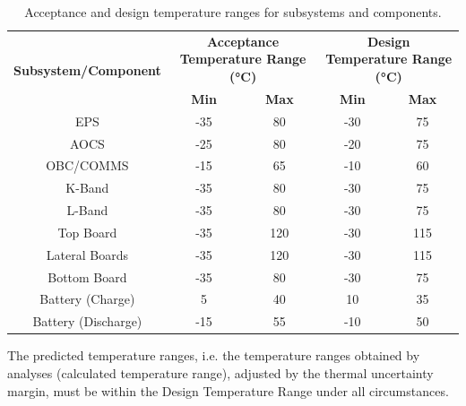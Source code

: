 \begin{table}[H]
    \centering
    \begin{tabular}{ccccc}
        \toprule
        \multirow{2}{*}{\textbf{Subsystem/Component}} &
        \multicolumn{2}{c}{\textbf{Acceptance Temperature Range (°C)}} &
        \multicolumn{2}{c}{\textbf{Design Temperature Range (°C)}} \\
        \cmidrule(lr){2-3} \cmidrule(lr){4-5}
        & \textbf{Min} & \textbf{Max} & \textbf{Min} & \textbf{Max} \\
        \midrule
        EPS              & -35 & 80  & -30 & 75  \\
        AOCS             & -25 & 80  & -20 & 75  \\
        OBC/COMMS        & -15 & 65  & -10 & 60  \\
        K-Band           & -35 & 80  & -30 & 75  \\
        L-Band           & -35 & 80  & -30 & 75  \\
        Top Board        & -35 & 120 & -30 & 115 \\
        Lateral Boards   & -35 & 120 & -30 & 115 \\
        Bottom Board     & -35 & 80  & -30 & 75  \\
        \midrule
        Battery (Charge)   & 5   & 40  & 10  & 35  \\
        Battery (Discharge) & -15 & 55  & -10 & 50  \\
        \bottomrule
    \end{tabular}
    \caption{Acceptance and design temperature ranges for subsystems and components.}
    \label{tab:DAQtemplimits}
\end{table}
The predicted temperature ranges, i.e. the temperature ranges obtained by analyses (calculated temperature range),
adjusted by the thermal uncertainty margin, must be within the Design Temperature Range under all circumstances.